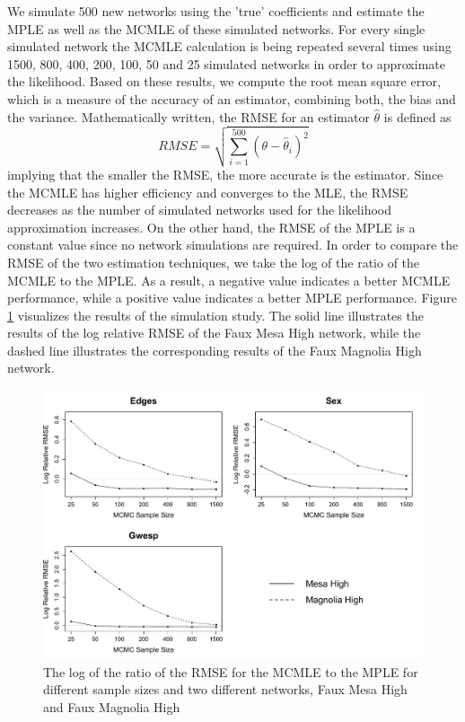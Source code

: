 \documentclass[headsepline=true, abstracton]{scrartcl}
\begin{document}
We simulate 500 new networks using the 'true' coefficients and estimate the MPLE as well as the MCMLE of these simulated networks. For every single simulated network the MCMLE calculation is being repeated several times using 1500, 800, 400, 200, 100, 50 and 25 simulated networks in order to approximate the likelihood.
Based on these results, we compute the root mean square error, which is a measure of the accuracy of an estimator, combining both, the bias and the variance. Mathematically written, the RMSE for an estimator $\hat{\theta}$ is defined as 
$$RMSE = \sqrt{\sum_{i=1}^{500}(\theta - \hat{\theta}_i)^2}$$
implying that the smaller the RMSE, the more accurate is the estimator. Since the MCMLE has higher efficiency and converges to the MLE, the RMSE decreases as the number of simulated networks used for the likelihood approximation increases. On the other hand, the RMSE of the MPLE is a constant value since no network simulations are required. In order to compare the RMSE of the two estimation techniques, we take the log of the ratio of the MCMLE to the MPLE. As a result, a negative value indicates a better MCMLE performance, while a positive value indicates a better MPLE performance. Figure \ref{rmse} visualizes the results of the simulation study. The solid line illustrates the results of the log relative RMSE of the Faux Mesa High network, while the dashed line illustrates the corresponding results of the Faux Magnolia High network. 

\begin{figure}[h]
\begin{center}
\includegraphics[scale=.5]{RMSE_paper}
\caption{The log of the ratio of the RMSE for the MCMLE to the MPLE for different sample sizes and two different networks, Faux Mesa High and Faux Magnolia High}
\label{rmse}
\end{center}
\end{figure}
\end{document}
